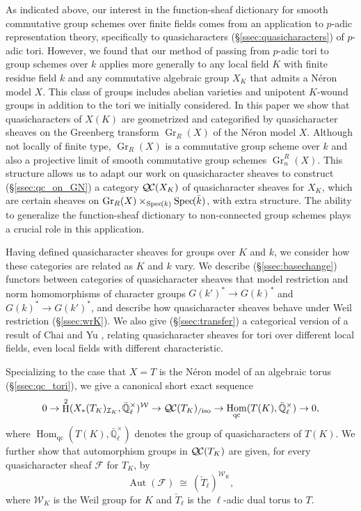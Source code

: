 \documentclass[CM,Submssn,SecEq]{degruyter-crelle} %
\theoremstyle{plain}
\theoremstyle{definition}
\theoremstyle{remark}
\newcommand{\EE}{\mathbb{\bar Q}_\ell}
\newcommand{\bFq}{\bar{k}}
\newcommand{\Fq}{k}
\newcommand{\EEx}{\EE^\times}
\newcommand{\Weil}[1]{\mathcal{W}_{#1}}
\DeclareMathOperator{\Aut}{Aut}
\DeclareMathOperator{\Hom}{Hom}
\DeclareMathOperator{\Gr}{Gr}
\DeclareMathOperator{\Hh}{H}
\newcommand{\Spec}[1]{{\operatorname{Spec}\hskip-1pt( #1 )}}
\newcommand{\iso}{{\ \cong\ }}
\newcommand{\qcs}[1]{{\mathcal{#1}}}
\newcommand{\QC}{{\mathcal{Q\hskip-0.8pt C}}}
\newcommand{\QCiso}[1]{\QC(#1)_{/\text{iso}}}
\begin{document}
As indicated above, our interest in the function-sheaf dictionary for smooth commutative group schemes
over finite fields comes from an application to $p$-adic representation theory,
specifically to quasicharacters (\S\ref{ssec:quasicharacters}) of $p$-adic tori.
However, we found that our method of passing from $p$-adic tori to group schemes over $\Fq$ applies more generally to
any local field $K$ with finite residue field $\Fq$ and any commutative algebraic group $X_K$ that admits a N\'eron model $X$. %
This class of groups includes abelian varieties and unipotent $K$-wound groups in addition to the tori we initially considered.
In this paper we show that quasicharacters of $X(K)$ are geometrized and categorified by quasicharacter sheaves on the
Greenberg transform $\Gr_R(X)$ of the N\'eron model $X$.
Although not locally of finite type, $\Gr_R(X)$ is a commutative group scheme over $\Fq$ and also a projective limit of smooth commutative group schemes $\Gr^R_n(X)$.
This structure allows us to adapt our work on quasicharacter sheaves to construct (\S\ref{ssec:qc_on_GN}) a category $\QC(X_K)$
of quasicharacter sheaves for $X_K$, which are certain sheaves on $\Gr_R(X)\times_{\Spec{\Fq}} \Spec{\bFq}$, with extra structure.
The ability to generalize the function-sheaf dictionary to non-connected group schemes plays a crucial role in this application.

Having defined quasicharacter sheaves for groups over $K$ and $\Fq$, we consider how
these categories are related as $K$ and $\Fq$ vary.  We describe (\S\ref{ssec:basechange}) functors between categories
of quasicharacter sheaves that model restriction and norm homomorphisms of character groups $G(k')^* \to G(k)^*$ and $G(k)^* \to G(k')^*$,
and describe how quasicharacter sheaves behave under Weil restriction (\S\ref{ssec:wrK}).  We also give (\S\ref{ssec:transfer})
a categorical version of a result of Chai and Yu \cite{chai-yu:01a},
relating quasicharacter sheaves for tori over different local fields, even local fields
with different characteristic.

Specializing to the case that $X = T$ is the N\'eron model of an algebraic torus (\S\ref{ssec:qc_tori}), 
we give a canonical short exact sequence 
\[
0 \to \Hh^2(X_*(T_K)_{\mathcal{I}_K},\EEx)^{\Weil{}} \to \QCiso{T_K} \to \Hom_\text{qc}(T(K),\EEx) \to 0,
\]
where $\Hom_\text{qc}(T(K),\EEx)$ denotes the group of quasicharacters of $T(K)$.
We further show that automorphism groups in $\QC(T_K)$ are given, for every quasicharacter sheaf $\qcs{F}$ for $T_K$, by
\[
\Aut(\qcs{F}) \iso (\check{T}_\ell)^{\Weil{K}},
\]
where $\Weil{K}$ is the Weil group for $K$ and $\check{T}_\ell$ is the $\ell$-adic dual torus to $T$.
\end{document}
